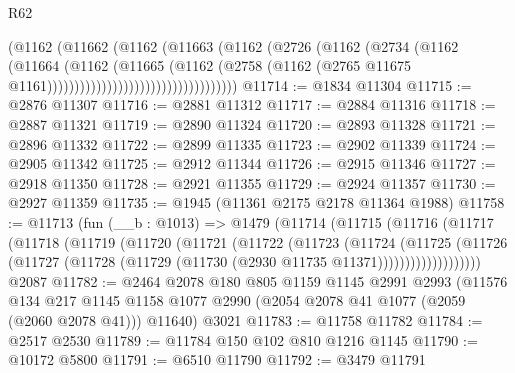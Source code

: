 \begin{lexlean}{R62}
\begin{coremodule}
                                          (@1162
                                            (@11662
                                              (@1162
                                                (@11663
                                                  (@1162
                                                    (@2726
                                                      (@1162
                                                        (@2734
                                                          (@1162
                                                            (@11664
                                                              (@1162
                                                                (@11665
                                                                  (@1162
                                                                    (@2758
                                                                      (@1162
                                                                        (@2765
                                                                          @11675
                                                                          @1161)))))))))))))))))))))))))))))))))))
@11714 := @1834 @11304
@11715 := @2876 @11307
@11716 := @2881 @11312
@11717 := @2884 @11316
@11718 := @2887 @11321
@11719 := @2890 @11324
@11720 := @2893 @11328
@11721 := @2896 @11332
@11722 := @2899 @11335
@11723 := @2902 @11339
@11724 := @2905 @11342
@11725 := @2912 @11344
@11726 := @2915 @11346
@11727 := @2918 @11350
@11728 := @2921 @11355
@11729 := @2924 @11357
@11730 := @2927 @11359
@11735 := @1945 (@11361 @2175 @2178 @11364 @1988)
@11758 := @11713
    (fun (__b : @1013) =>
    @1479
      (@11714
        (@11715
          (@11716
            (@11717
              (@11718
                (@11719
                  (@11720
                    (@11721
                      (@11722
                        (@11723
                          (@11724
                            (@11725
                              (@11726
                                (@11727
                                  (@11728 (@11729 (@11730 (@2930 @11735 @11371)))))))))))))))))))
    @2087
@11782 := @2464
    @2078
    @180
    @805
    @1159
    @1145
    @2991
    @2993
    (@11576
      @134
      @217
      @1145
      @1158
      @1077
      @2990
      (@2054 @2078 @41 @1077 (@2059 (@2060 @2078 @41)))
      @11640)
    @3021
@11783 := @11758 @11782
@11784 := @2517 @2530
@11789 := @11784 @150 @102 @810 @1216 @1145
@11790 := @10172 @5800
@11791 := @6510 @11790
@11792 := @3479 @11791

\end{coremodule}
\end{lexlean}
